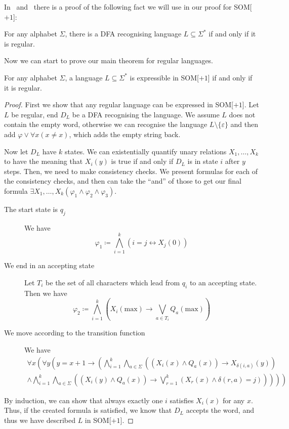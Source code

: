 In~\cite{theory-cs} and~\cite{Straubing1994} there is a proof of the following fact we will use in our proof for SOM[$+1$]:
\begin{theorem}
    For any alphabet $\Sigma$, there is a DFA recognising language $L \subseteq \Sigma^{*}$ if and only if it is regular.
\end{theorem}

Now we can start to prove our main theorem for regular languages.
\begin{theorem}
    For any alphabet $\Sigma$, a language $L \subseteq \Sigma^{*}$ is expressible in SOM[$+1$] if and only if it is regular.
\end{theorem}

\begin{proof}
    First we show that any regular language can be expressed in SOM[$+1$].
    Let $L$ be regular, end $D_L$ be a DFA recognising the language.
    We assume $L$ does not contain the empty word, otherwise we can recognise the language $L \setminus \{\varepsilon\}$ and then add $\varphi \lor \forall x(x \neq x)$, which adds the empty string back.

    Now let $D_L$ have $k$ states.
    We can existentially quantify unary relations $X_1, \dots, X_k$ to have the meaning that $X_i(y)$ is true if and only if $D_L$ is in state $i$ after $y$ steps.
    Then, we need to make consistency checks.
    We present formulas for each of the consistency checks, and then can take the ``and'' of those to get our final formula $\exists X_1, \dots, X_k(\varphi_1 \land \varphi_2 \land \varphi_3)$.
    \begin{description}
        \item[The start state is $q_j$] We have \[\varphi_1 \coloneqq \bigwedge_{i = 1}^{k} (i = j \leftrightarrow X_j(0))\]
        \item[We end in an accepting state] Let $T_i$ be the set of all characters which lead from $q_i$ to an accepting state.
        Then we have
        \[
            \varphi_2 \coloneqq \bigwedge_{i = 1}^{k}\left(X_i(\text{max}) \to \bigvee_{a \in T_i} Q_a(\text{max})\right)
        \]
        \item[We move according to the transition function] We have
        \begin{align*}
            \forall x\left( \forall y \left( y = x + 1 \to \left(\bigwedge_{i = 1}^{k} \bigwedge_{a \in \Sigma} \left(\left(X_i(x) \land Q_a(x)\right) \to X_{\delta(i, a)}(y)\right) \right. \right. \right. \\
            \left. \left. \left.\land \bigwedge_{i = 1}^{k}\bigwedge_{a \in \Sigma} \left(\left(X_i(y) \land Q_a(x)\right) \to \bigvee_{r = 1}^{k}\left(X_r(x) \land \delta(r, a) = j\right)\right)  \right)  \right) \right)
        \end{align*}
    \end{description}
    By induction, we can show that always exactly one $i$ satisfies $X_i(x)$ for any $x$.
    Thus, if the created formula is satisfied, we know that $D_L$ accepts the word, and thus we have described $L$ in SOM[$+1$].


\end{proof}
